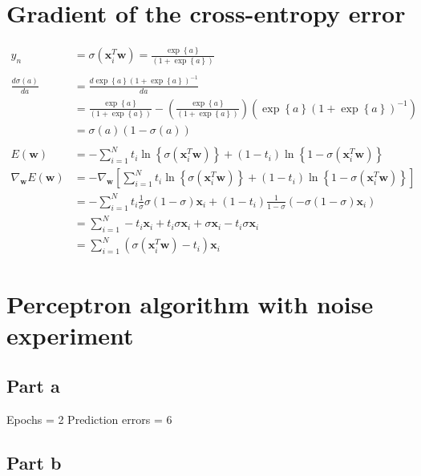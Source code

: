 \documentclass{article}
\newcommand{\diff}[2]{
        \frac{d #1}{d #2}
}
\begin{document}
\section{Gradient of the cross-entropy error}
\begin{align*}
y_n &= \sigma(\bm{x}_{i}^{T}\bm{w})=\frac{\exp\left\{ a \right\}}{\left( 1+\exp\left\{ a\right\} \right)}\\
&\nonumber\\
\diff{\sigma(a)}{a} &= \diff{\exp\left\{ a \right\} \left( 1+\exp\left\{ a\right\} \right)^{-1}}{a}\\
		    &= \frac{\exp\left\{ a \right\}}{\left( 1+\exp\left\{ a\right\} \right)} -
		       \left( 
			\frac{\exp\left\{ a \right\}}{\left( 1+\exp\left\{ a\right\} \right)}
		       \right)
		       \left(
			\exp\left\{ a \right\} \left( 1+\exp\left\{ a\right\} \right)^{-1}
		       \right)\\
		    &= \sigma(a)\left(1-\sigma(a)\right)\\
&\nonumber\\
E(\bm{w}) &= -\sum_{i=1}^N t_i \ln\left\{ \sigma(\bm{x}_{i}^{T} \bm{w}) \right\} + (1-t_i)\ln\left\{1-\sigma(\bm{x}_{i}^{T}\bm{w})\right\}\\
\nabla_{\bm{w}} E(\bm{w}) &= -\nabla_{\bm{w}}\left[\sum_{i=1}^N t_i \ln\left\{ \sigma(\bm{x}_{i}^{T}\bm{w}) \right\} + (1-t_i)\ln\left\{1-\sigma(\bm{x}_{i}^{T}\bm{w})\right\}\right]\\
&=-\sum_{i=1}^N t_i \frac{1}{\sigma} \sigma(1-\sigma)\bm{x}_{i} + (1-t_i) \frac{1}{1-\sigma} \left(-\sigma(1-\sigma)\bm{x}_{i}\right)\\
&=\sum_{i=1}^{N} -t_i \bm{x}_{i} + t_i \sigma \bm{x}_{i} + \sigma \bm{x}_{i} - t_i \sigma \bm{x}_{i}\\
&=\sum_{i=1}^{N} (\sigma(\bm{x}_{i}^{T}\bm{w}) - t_i)\bm{x}_{i}
\end{align*}
\section{Perceptron algorithm with noise experiment}

\subsection*{Part a}
Epochs = 2
Prediction errors = 6

\subsection*{Part b}
\end{document}
